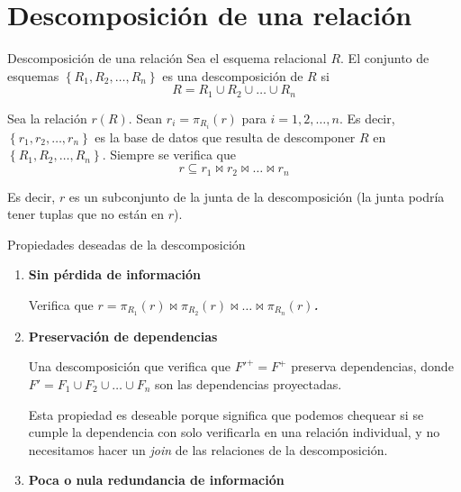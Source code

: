 \documentclass[a4paper, twoside]{article}
\begin{document}
\section{Descomposición de una relación}
\begin{definicion}[0.9\textwidth]{Descomposición de una relación}
	Sea el esquema relacional $R$. El conjunto de esquemas $\left\{ R_{1},R_{2},\dots,R_{n}\right\}$ es una descomposición de $R$ si
	\[
		R = R_{1}\cup R_{2}\cup\dots\cup R_{n}
	\]

	Sea la relación $r(R)$. Sean $r_{i} = \pi_{R_{i}}(r)$ para $i = 1, 2, \dots, n$. Es decir, $\left\{ r_{1}, r_{2}, \dots, r_{n} \right\}$ es la base de datos que resulta de descomponer $R$ en $\left\{ R_{1}, R_{2}, \dots, R_{n} \right\}$. Siempre se verifica que
	\[
		r \subseteq r_{1} \bowtie r_{2} \bowtie \dots \bowtie r_{n}
	\]

	Es decir, $r$ es un subconjunto de la junta de la descomposición (la junta podría tener tuplas que no están en $r$).
\end{definicion}

\begin{propiedades}[0.9\textwidth]{Propiedades deseadas de la descomposición}
	\begin{enumerate}
		\item \textbf{Sin pérdida de información}

		Verifica que \textbf{\emph{$r=\pi_{R_{1}}(r)\bowtie\pi_{R_{2}}(r)\bowtie\dots\bowtie\pi_{R_{n}}(r)$.}}

		\item \textbf{Preservación de dependencias}

		Una descomposición que verifica que $F'^{+} = F^{+}$ preserva dependencias, donde $F' = F_{1} \cup F_{2} \cup \dots \cup F_{n}$ son las dependencias proyectadas.

		Esta propiedad es deseable porque significa que podemos chequear si se cumple la dependencia con solo verificarla en una relación individual, y no necesitamos hacer un \emph{join} de las relaciones de la descomposición.

		\item \textbf{Poca o nula redundancia de información}
	\end{enumerate}
\end{propiedades}
\end{document}
